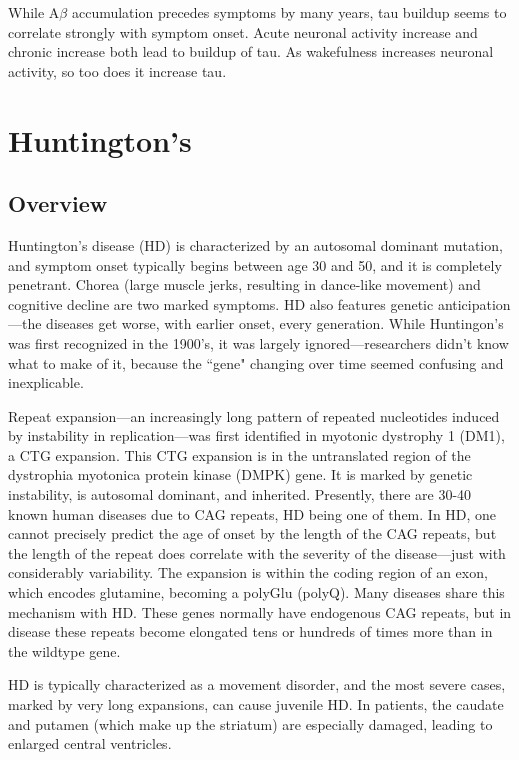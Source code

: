 While A$\beta$ accumulation precedes symptoms by many years, tau buildup seems to correlate strongly with symptom onset. Acute neuronal activity increase and chronic increase both lead to buildup of tau. As wakefulness increases neuronal activity, so too does it increase tau.


\section{Huntington's}

\subsection*{Overview}

Huntington's disease (HD) is characterized by an autosomal dominant mutation, and symptom onset typically begins between age 30 and 50, and it is completely penetrant. Chorea (large muscle jerks, resulting in dance-like movement) and cognitive decline are two marked symptoms. HD also features genetic anticipation---the diseases get worse, with earlier onset, every generation. While Huntingon's was first recognized in the 1900's, it was largely ignored---researchers didn't know what to make of it, because the ``gene" changing over time seemed confusing and inexplicable. \newline

Repeat expansion---an increasingly long pattern of repeated nucleotides induced by instability in replication---was first identified in myotonic dystrophy 1 (DM1), a CTG expansion. This CTG expansion is in the untranslated region of the dystrophia myotonica protein kinase (DMPK) gene. It is marked by genetic instability, is autosomal dominant, and inherited. Presently, there are 30-40 known human diseases due to CAG repeats, HD being one of them. In HD, one cannot precisely predict the age of onset by the length of the CAG repeats, but the length of the repeat does correlate with the severity of the disease---just with considerably variability. The expansion is within the coding region of an exon, which encodes glutamine, becoming a polyGlu (polyQ). Many diseases share this mechanism with HD. These genes normally have endogenous CAG repeats, but in disease these repeats become elongated tens or hundreds of times more than in the wildtype gene.\newline

HD is typically characterized as a movement disorder, and the most severe cases, marked by very long expansions, can cause juvenile HD. In patients, the caudate and putamen (which make up the striatum) are especially damaged, leading to enlarged central ventricles. \newline

